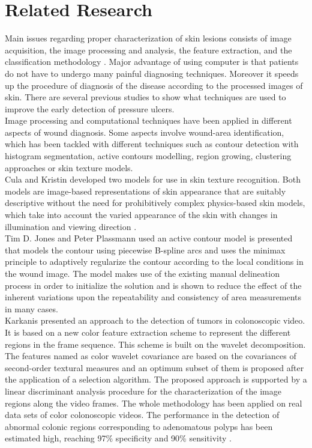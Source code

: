 \section{Related Research}
Main issues regarding proper characterization of skin lesions consists of image acquisition, the image processing and analysis, the feature extraction, and the classification methodology \cite{Patel}. Major advantage of using computer is that patients do not have to undergo many painful diagnosing techniques. Moreover it speeds up the procedure of diagnosis of the disease according to the processed images of skin. There are several previous studies to show what techniques are used to improve the early detection of pressure ulcers.\\

Image processing and computational techniques have been applied in different aspects of wound diagnosis. Some aspects involve wound-area identification, which has been tackled with different techniques such as contour detection with
histogram segmentation, active contours modelling, region growing, clustering approaches or skin texture models.\\

Cula and Kristin developed two models for use in skin texture recognition. Both models are image-based representations of skin
appearance that are suitably descriptive without the need for prohibitively complex physics-based skin models, which take into account the varied appearance of the skin with changes in illumination and viewing direction \cite{Cula}.\\

Tim D. Jones and Peter Plassmann used an active contour model is presented that models the contour using piecewise B-spline arcs and uses the minimax principle
to adaptively regularize the contour according to the local conditions in the wound image. The model makes use of the existing manual delineation process in order to initialize the solution and is shown to reduce the effect of the inherent variations upon the repeatability and consistency of area measurements in many cases.\cite{Jones}\\

Karkanis presented an approach to the detection of tumors
in colonoscopic video. It is based on a new color feature extraction scheme to represent the different regions in the frame sequence. This scheme is built on the wavelet decomposition. The features named as color wavelet covariance are based on the covariances of second-order textural measures and an optimum subset
of them is proposed after the application of a selection algorithm.
The proposed approach is supported by a linear discriminant analysis procedure for the characterization of the image regions
along the video frames. The whole methodology has been applied
on real data sets of color colonoscopic videos. The performance in
the detection of abnormal colonic regions corresponding to adenomatous
polyps has been estimated high, reaching 97\% specificity
and 90\% sensitivity \cite{Karkanis}.\\

